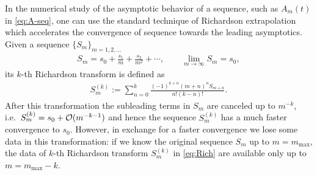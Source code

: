 \documentclass[11pt]{article}
\renewcommand{\[}{\begin{eqnarray}}
\renewcommand{\]}{\end{eqnarray}}
\begin{document}
In the numerical study of the asymptotic behavior of 
a sequence, such
as $A_m(t)$ in \eqref{eq:A-seq},
one can use the 
standard technique
of Richardson extrapolation
which accelerates the convergence of 
sequence towards the leading asymptotics. 
Given a sequence $\{S_m\}_{m=1,2,\ldots}$
%
\begin{align}
S_m=s_0+\frac{s_1}{m}+\frac{s_2}{m^2}+\cdots,\qquad
\lim_{m\to\infty}S_m=s_0,
\end{align}
%
its $k$-th Richardson transform is defined as
%
\begin{align}
S_m^{(k)}:=\sum_{n=0}^k\frac{(-1)^{k+n}(m+n)^nS_{m+n}}{n!(k-n)!}.
\label{eq:Rich}
\end{align}
%
After this transformation
the subleading terms in $S_m$ are canceled up to $m^{-k}$,
i.e.~$S_m^{(k)}=s_0+{\cal O}(m^{-k-1})$ and hence
the sequence $S_m^{(k)}$ has a much faster convergence to $s_0$.
However, in exchange for a faster convergence we lose some data 
in this transformation:
if we know the original sequence $S_m$ up to $m=m_{\text{max}}$,
the data of $k$-th Richardson transform $S_m^{(k)}$
in \eqref{eq:Rich} 
are available only up to $m=m_{\text{max}}-k$.
\end{document}
